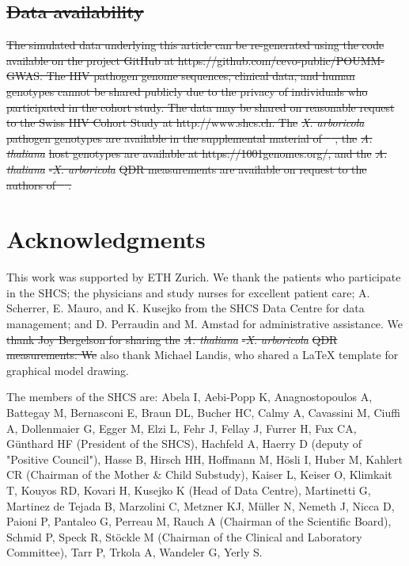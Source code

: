 \documentclass[12pt]{article} %
\providecommand{\DIFdel}[1]{{\protect\color{red}\sout{#1}}}                      %
\providecommand{\DIFdelbegin}{} %
\providecommand{\DIFdelend}{} %
\newcommand{\DIFscaledelfig}{0.5}
\newlength{\DIFdelgraphicswidth} %
\newlength{\DIFdelgraphicsheight} %
\newcommand{\DIFdelincludegraphics}[2][]{%
\sbox{\DIFdelgraphicsbox}{\DIFOincludegraphics[#1]{#2}}%
\settoboxwidth{\DIFdelgraphicswidth}{\DIFdelgraphicsbox} %
\settoboxtotalheight{\DIFdelgraphicsheight}{\DIFdelgraphicsbox} %
\scalebox{\DIFscaledelfig}{%
\parbox[b]{\DIFdelgraphicswidth}{\usebox{\DIFdelgraphicsbox}\\[-\baselineskip] \rule{\DIFdelgraphicswidth}{0em}}\llap{\resizebox{\DIFdelgraphicswidth}{\DIFdelgraphicsheight}{%
\setlength{\unitlength}{\DIFdelgraphicswidth}%
\begin{picture}(1,1)%
\thicklines\linethickness{2pt} %
{\color[rgb]{1,0,0}\put(0,0){\framebox(1,1){}}}%
{\color[rgb]{1,0,0}\put(0,0){\line( 1,1){1}}}%
{\color[rgb]{1,0,0}\put(0,1){\line(1,-1){1}}}%
\end{picture}%
}\hspace*{3pt}}} %
} %
\DeclareRobustCommand{\DIFdelbegin}{\DIFOdelbegin \let\includegraphics\DIFdelincludegraphics} %
\DeclareRobustCommand{\DIFdelend}{\DIFOaddend \let\includegraphics\DIFOincludegraphics} %
\begin{document}
\begin{doublespace}
\DIFdelbegin \subsection*{\DIFdel{Data availability}}
\DIFdel{The simulated data underlying this article can be re-generated using the code available on the project GitHub at https://github.com/cevo-public/POUMM-GWAS. The HIV pathogen genome sequences, clinical data, and human genotypes cannot be shared publicly due to the privacy of individuals who participated in the cohort study. The data may be shared on reasonable request to the Swiss HIV Cohort Study at http://www.shcs.ch. The }\emph{\DIFdel{X. arboricola}} %
\DIFdel{pathogen genotypes are available in the supplemental material of \mbox{%
\citep{Wang2018Two-wayGenomes}}\hskip0pt%
, the }\emph{\DIFdel{A. thaliana}} %
\DIFdel{host genotypes are available at https://1001genomes.org/, and the }\emph{\DIFdel{A. thaliana}}%
\DIFdel{-}\emph{\DIFdel{X. arboricola}} %
\DIFdel{QDR measurements are available on request to the authors of \mbox{%
\citep{Wang2018Two-wayGenomes}}\hskip0pt%
.
}%

\DIFdelend \section*{Acknowledgments}

This work was supported by ETH Zurich. We thank the patients who participate in the SHCS; the physicians and study nurses for excellent patient care; A. Scherrer,  E. Mauro, and K. Kusejko from the SHCS Data Centre for data management; and D. Perraudin and M. Amstad for administrative assistance. We \DIFdelbegin \DIFdel{thank Joy Bergelson for sharing the }\emph{\DIFdel{A. thaliana}}%
\DIFdel{-}\emph{\DIFdel{X. arboricola}} %
\DIFdel{QDR measurements. We }\DIFdelend also thank Michael Landis, who shared a LaTeX template for graphical model drawing.

The members of the SHCS are:
Abela I, Aebi-Popp K, Anagnostopoulos A, Battegay M, Bernasconi E, Braun DL, Bucher HC, Calmy A, Cavassini M, Ciuffi A, Dollenmaier G, Egger M, Elzi L, Fehr J, Fellay J, Furrer H, Fux CA, Günthard HF (President of the SHCS), Hachfeld A, Haerry D (deputy of "Positive Council"), Hasse B, Hirsch HH, Hoffmann M, Hösli I, Huber M, Kahlert CR (Chairman of the Mother & Child Substudy), Kaiser L, Keiser O, Klimkait T, Kouyos RD, Kovari H, Kusejko K (Head of Data Centre), Martinetti G, Martinez de Tejada B, Marzolini C, Metzner KJ, Müller N, Nemeth J, Nicca D, Paioni P, Pantaleo G, Perreau M, Rauch A (Chairman of the Scientific Board), Schmid P, Speck R, Stöckle M (Chairman of the Clinical and Laboratory Committee), Tarr P, Trkola A, Wandeler G, Yerly S.


\end{doublespace}
\end{document}
